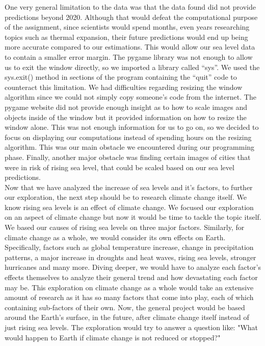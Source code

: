 \documentclass[fontsize=11pt]{article}
\begin{document}
One very general limitation to the data was that the data found did not provide predictions beyond 2020. Although that would defeat the computational purpose of the assignment, since scientists would spend months, even years researching topics such as thermal expansion, their future predictions would end up being more accurate compared to our estimations. This would allow our sea level data to contain a smaller error margin. The pygame library was not enough to allow us to exit the window directly, so we imported a library called “sys”. We used the sys.exit() method in sections of the program containing the “quit” code to counteract this limitation. We had difficulties regarding resizing the window algorithm since we could not simply copy someone’s code from the internet. The pygame website did not provide enough insight as to how to scale images and objects inside of the window but it provided information on how to resize the window alone. This was not enough information for us to go on, so we decided to focus on displaying our computations instead of spending hours on the resizing algorithm. This was our main obstacle we encountered during our programming phase. Finally, another major obstacle was finding certain images of cities that were in risk of rising sea level, that could be scaled based on our sea level predictions.\\

Now that we have analyzed the increase of sea levels and it’s factors, to further our exploration, the next step should be to research climate change itself. We know rising sea levels is an effect of climate change. We focused our exploration on an aspect of climate change but now it would be time to tackle the topic itself. We based our causes of rising sea levels on three major factors. Similarly, for climate change as a whole, we would consider its own effects on Earth. Specifically, factors such as global temperature increase, change in precipitation patterns, a major increase in droughts and heat waves, rising sea levels, stronger hurricanes and many more. Diving deeper, we would have to analyze each factor’s effects themselves to analyze their general trend and how devastating each factor may be. This exploration on climate change as a whole would take an extensive amount of research as it has so many factors that come into play, each of which containing sub-factors of their own. Now, the general project would be based around the Earth’s surface, in the future, after climate change itself instead of just rising sea levels. The exploration would try to answer a question like: "What would happen to Earth if climate change is not reduced or stopped?"
\newpage
\end{document}
